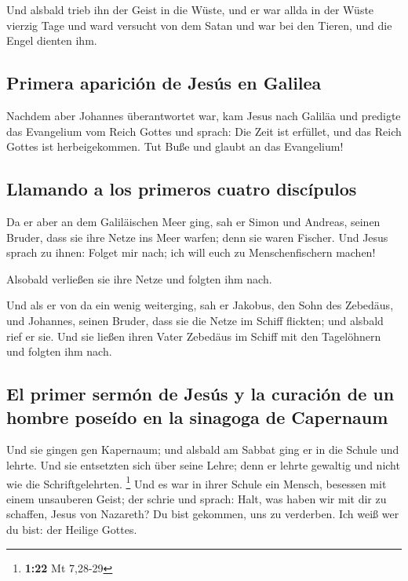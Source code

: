  Und alsbald trieb ihn der Geist in die Wüste,
 und er war allda in der Wüste vierzig Tage und ward
versucht von dem Satan und war bei den Tieren, und die Engel dienten
ihm.

\hypertarget{primera-apariciuxf3n-de-jesuxfas-en-galilea}{%
\subsection{Primera aparición de Jesús en
Galilea}\label{primera-apariciuxf3n-de-jesuxfas-en-galilea}}

 Nachdem aber Johannes überantwortet war, kam Jesus nach
Galiläa und predigte das Evangelium vom Reich Gottes  und
sprach: Die Zeit ist erfüllet, und das Reich Gottes ist herbeigekommen.
Tut Buße und glaubt an das Evangelium!

\hypertarget{llamando-a-los-primeros-cuatro-discuxedpulos}{%
\subsection{Llamando a los primeros cuatro
discípulos}\label{llamando-a-los-primeros-cuatro-discuxedpulos}}

 Da er aber an dem Galiläischen Meer ging, sah er Simon
und Andreas, seinen Bruder, dass sie ihre Netze ins Meer warfen; denn
sie waren Fischer.  Und Jesus sprach zu ihnen: Folget mir
nach; ich will euch zu Menschenfischern machen!

 Alsobald verließen sie ihre Netze und folgten ihm nach.

 Und als er von da ein wenig weiterging, sah er Jakobus,
den Sohn des Zebedäus, und Johannes, seinen Bruder, dass sie die Netze
im Schiff flickten; und alsbald rief er sie.  Und sie
ließen ihren Vater Zebedäus im Schiff mit den Tagelöhnern und folgten
ihm nach.

\hypertarget{el-primer-sermuxf3n-de-jesuxfas-y-la-curaciuxf3n-de-un-hombre-poseuxeddo-en-la-sinagoga-de-capernaum}{%
\subsection{El primer sermón de Jesús y la curación de un hombre poseído
en la sinagoga de
Capernaum}\label{el-primer-sermuxf3n-de-jesuxfas-y-la-curaciuxf3n-de-un-hombre-poseuxeddo-en-la-sinagoga-de-capernaum}}

 Und sie gingen gen Kapernaum; und alsbald am Sabbat ging
er in die Schule und lehrte.  Und sie entsetzten sich
über seine Lehre; denn er lehrte gewaltig und nicht wie die
Schriftgelehrten. \footnote{\textbf{1:22} Mt 7,28-29} 
Und es war in ihrer Schule ein Mensch, besessen mit einem unsauberen
Geist; der schrie  und sprach: Halt, was haben wir mit
dir zu schaffen, Jesus von Nazareth? Du bist gekommen, uns zu verderben.
Ich weiß wer du bist: der Heilige Gottes.


